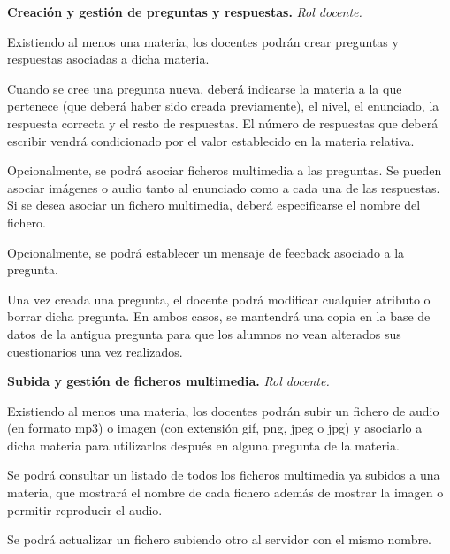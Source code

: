 \begin{rf0}
	\item \textbf{Creación y gestión de preguntas y respuestas.}  \textit{Rol docente.} 
		\begin{rf0*}
			\item Existiendo al menos una materia, los docentes podrán crear preguntas y respuestas asociadas a dicha materia.
			\item Cuando se cree una pregunta nueva, deberá indicarse la materia a la que pertenece (que deberá haber sido creada previamente), el nivel, el enunciado, la respuesta correcta y el resto de respuestas. El número de respuestas que deberá escribir vendrá condicionado por el valor establecido en la materia relativa.
			\item Opcionalmente, se podrá asociar ficheros multimedia a las preguntas. Se pueden asociar imágenes o audio tanto al enunciado como a cada una de las respuestas. Si se desea asociar un fichero multimedia, deberá especificarse el nombre del fichero.
			\item Opcionalmente, se podrá establecer un mensaje de feecback asociado a la pregunta.
			\item Una vez creada una pregunta, el docente podrá modificar cualquier atributo o borrar dicha pregunta. En ambos casos, se mantendrá una copia en la base de datos de la antigua pregunta para que los alumnos no vean alterados sus cuestionarios una vez realizados.
		\end{rf0*}
	
	\item \textbf{Subida y gestión de ficheros multimedia.}  \textit{Rol docente.} 
		\begin{rf0*}
			\item Existiendo al menos una materia, los docentes podrán subir un fichero de audio (en formato mp3) o imagen (con extensión gif, png, jpeg o jpg) y asociarlo a dicha materia para utilizarlos después en alguna pregunta de la materia.
			\item Se podrá consultar un listado de todos los ficheros multimedia ya subidos a una materia, que mostrará el nombre de cada fichero además de mostrar la imagen o permitir reproducir el audio.
			\item Se podrá actualizar un fichero subiendo otro al servidor con el mismo nombre.
		\end{rf0*}


\end{rf0}
